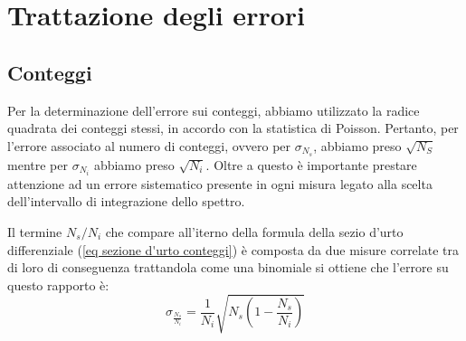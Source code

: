 \section{Trattazione degli errori}\label{sez_errori}
\subsection{Conteggi}\label{sez_err_conteggi}
Per la determinazione dell'errore sui conteggi, abbiamo utilizzato la radice quadrata dei conteggi stessi, in accordo con la statistica di Poisson. Pertanto, per l'errore associato al numero di conteggi, ovvero per $\sigma_{N_{s}}$, abbiamo preso $\sqrt{N_{S}}$ mentre per $\sigma_{N_{i}}$ abbiamo preso $\sqrt{N_{i}}$. Oltre a questo è importante prestare attenzione ad un errore sistematico presente in ogni misura legato alla scelta dell'intervallo di integrazione dello spettro.

Il termine $N_s/N_i$ che compare all'iterno della formula della sezio d'urto differenziale (\ref{eq sezione d'urto conteggi}) è composta da due misure correlate tra di loro di conseguenza trattandola come una binomiale si ottiene che l'errore su questo rapporto è:
\begin{equation}
    \sigma_{\frac{N_s}{N_i}}=\frac{1}{N_i}\sqrt{N_s\left(1-\frac{N_s}{N_i}\right)}
\end{equation}
